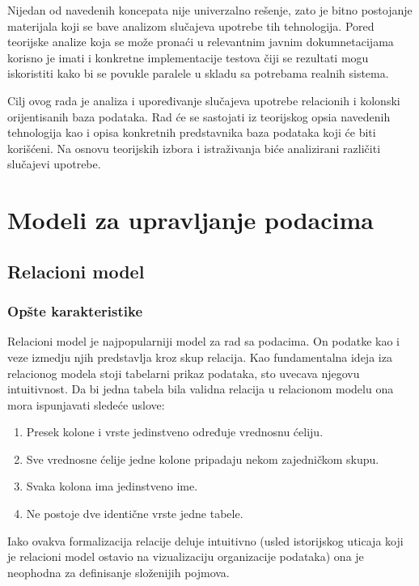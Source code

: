 \documentclass[12pt,oneside]{memoir}
\begin{document}
Nijedan od navedenih koncepata nije univerzalno rešenje, zato je bitno postojanje materijala koji se bave analizom slučajeva upotrebe tih tehnologija. Pored teorijske analize koja se može pronaći u relevantnim javnim dokumnetacijama korisno je imati i konkretne implementacije testova čiji se rezultati mogu iskoristiti kako bi se povukle paralele u skladu sa potrebama realnih  sistema. 

Cilj ovog rada je analiza i upoređivanje slučajeva upotrebe relacionih i kolonski orijentisanih baza podataka. Rad će se sastojati iz teorijskog opsia navedenih tehnologija kao i opisa konkretnih predstavnika baza podataka koji će biti korišćeni. Na osnovu teorijskih izbora i istraživanja biće analizirani različiti slučajevi upotrebe. 


\chapter{Modeli za upravljanje podacima}
\label{chp:razrada}
\section{Relacioni model}
\subsection{Opšte karakteristike}
Relacioni model je najpopularniji model za rad sa podacima. On podatke kao i veze izmedju njih predstavlja kroz skup relacija. Kao fundamentalna ideja iza relacionog modela stoji tabelarni prikaz podataka, sto uvecava njegovu intuitivnost. Da bi jedna tabela bila validna relacija u relacionom modelu ona mora ispunjavati sledeće uslove:

\begin{enumerate}
\item[\textbullet] Presek kolone i vrste jedinstveno određuje vrednosnu ćeliju.

\item[\textbullet] Sve vrednosne ćelije jedne kolone pripadaju nekom zajedničkom skupu. 

\item[\textbullet] Svaka kolona ima jedinstveno ime.

\item[\textbullet] Ne postoje dve identične vrste jedne tabele. 
\end{enumerate}

Iako ovakva formalizacija relacije deluje intuitivno (usled istorijskog uticaja koji je relacioni model ostavio na vizualizaciju organizacije podataka) ona je neophodna za  definisanje složenijih pojmova. 
\end{document}
